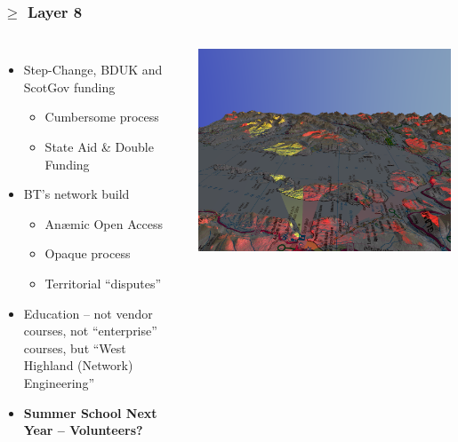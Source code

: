 \documentclass{beamer}
\begin{document}
\begin{frame}
  \frametitle{$\geq$ Layer 8}
  \begin{columns}
    \begin{itemize}
      \item Step-Change, BDUK and ScotGov funding
        \begin{itemize}
          \item Cumbersome process
          \item State Aid \& Double Funding
        \end{itemize}
      \item BT's network build
        \begin{itemize}
          \item An\ae{}mic Open Access
          \item Opaque process
          \item Territorial ``disputes''
        \end{itemize}
      \item Education -- not vendor courses, not ``enterprise''
        courses, but ``West Highland (Network) Engineering''
      \item \textbf{\color{hubsblue} Summer School Next Year --
        Volunteers?}
    \end{itemize}
    \hspace{-2em}\includegraphics[width=1.1\textwidth]{portree-3d.png}\\

\end{columns}
\end{frame}
\end{document}
